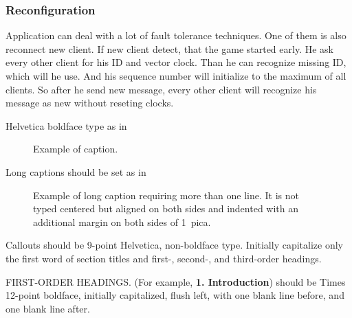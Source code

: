\documentclass[times, 10pt,twocolumn]{article}
\begin{document}
\subsubsection{Reconfiguration}
Application can deal with a lot of fault tolerance techniques. One of them is also reconnect new client. If new client detect, that the game started early. He ask every other client for his ID and vector clock. Than he can recognize missing ID, which will he use. And his sequence number will initialize to the maximum of all clients. So after he send new message, every other client will recognize his message as new without reseting clocks.










































Helvetica boldface type as in
\begin{figure}[h]
   \caption{Example of caption.}
\end{figure}

\noindent Long captions should be set as in 
\begin{figure}[h] 
   \caption{Example of long caption requiring more than one line. It is 
     not typed centered but aligned on both sides and indented with an 
     additional margin on both sides of 1~pica.}
\end{figure}

\noindent Callouts should be 9-point Helvetica, non-boldface type. 
Initially capitalize only the first word of section titles and first-, 
second-, and third-order headings.

FIRST-ORDER HEADINGS. (For example, {\large \bf 1. Introduction}) 
should be Times 12-point boldface, initially capitalized, flush left, 
with one blank line before, and one blank line after.
\end{document}
